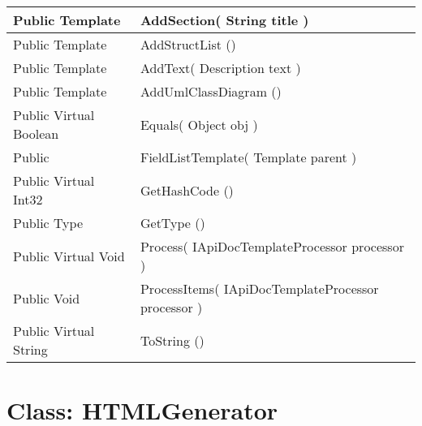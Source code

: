 \documentclass[11pt, oneside, a4paper]{book}
\begin{document}
\begin{center}
\begin{tabular}{| p{3cm} | p{12cm} | }
\hline
 Public  Template &  AddSection(\hypertarget{SoftwareEngineeringTools.{}Documentation.{}FieldListTemplate.{}AddSection\_String}{} String  title  )\\
\hline
 Public  Template &  AddStructList ()\hypertarget{SoftwareEngineeringTools.{}Documentation.{}FieldListTemplate.{}AddStructList}{}\\
\hline
 Public  Template &  AddText(\hypertarget{SoftwareEngineeringTools.{}Documentation.{}FieldListTemplate.{}AddText\_Description}{} Description  text  )\\
\hline
 Public  Template &  AddUmlClassDiagram ()\hypertarget{SoftwareEngineeringTools.{}Documentation.{}FieldListTemplate.{}AddUmlClassDiagram}{}\\
\hline
 Public  Virtual  Boolean &  Equals(\hypertarget{SoftwareEngineeringTools.{}Documentation.{}FieldListTemplate.{}Equals\_Object}{} Object  obj  )\\
\hline
 Public  &  FieldListTemplate(\hypertarget{SoftwareEngineeringTools.{}Documentation.{}FieldListTemplate.{}FieldListTemplate\_Template}{} Template  parent  )\\
\hline
 Public  Virtual  Int32 &  GetHashCode ()\hypertarget{SoftwareEngineeringTools.{}Documentation.{}FieldListTemplate.{}GetHashCode}{}\\
\hline
 Public  Type &  GetType ()\hypertarget{SoftwareEngineeringTools.{}Documentation.{}FieldListTemplate.{}GetType}{}\\
\hline
 Public  Virtual  Void &  Process(\hypertarget{SoftwareEngineeringTools.{}Documentation.{}FieldListTemplate.{}Process\_IApiDocTemplateProcessor}{} IApiDocTemplateProcessor  processor  )\\
\hline
 Public  Void &  ProcessItems(\hypertarget{SoftwareEngineeringTools.{}Documentation.{}FieldListTemplate.{}ProcessItems\_IApiDocTemplateProcessor}{} IApiDocTemplateProcessor  processor  )\\
\hline
 Public  Virtual  String &  ToString ()\hypertarget{SoftwareEngineeringTools.{}Documentation.{}FieldListTemplate.{}ToString}{}\\
\hline
\end{tabular}
\end{center}
 


\hypertarget{SoftwareEngineeringTools.{}Documentation.{}HTMLGenerator}{}
\section{Class: HTMLGenerator}
\end{document}
